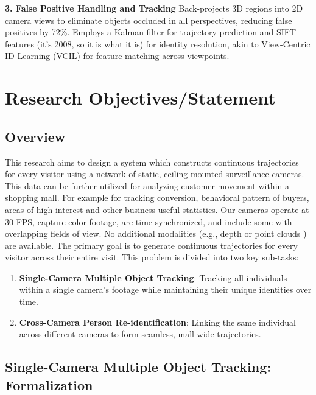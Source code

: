 \documentclass[12pt, a4paper]{article}
\begin{document}
 \textbf{3. False Positive Handling and Tracking} Back-projects 3D regions into 2D camera views to eliminate objects occluded in all perspectives, reducing false positives by 72\%. Employs a Kalman filter for trajectory prediction and SIFT features (it's 2008, so it is what it is) for identity resolution, akin to \cite{Homography-UAV} View-Centric ID Learning (VCIL) for feature matching across viewpoints.

\section{Research Objectives/Statement}

\subsection{Overview}

This research aims to design a system which constructs continuous trajectories for every visitor using a network of static, ceiling-mounted surveillance cameras. This data can be further utilized for analyzing customer movement within a shopping mall. For example for tracking conversion, behavioral pattern of buyers, areas of high interest and other business-useful statistics. Our cameras operate at 30 FPS, capture color footage, are time-synchronized, and include some with overlapping fields of view. No additional modalities (e.g., depth or point clouds \cite{rgb-depth, 3D-pose-estimation-review, PointNet}) are available. The primary goal is to generate continuous trajectories for every visitor across their entire visit. This problem is divided into two key sub-tasks:

\begin{enumerate}
	\item \textbf{Single-Camera Multiple Object Tracking}: Tracking all individuals within a single camera’s footage while maintaining their unique identities over time.
	\item \textbf{Cross-Camera Person Re-identification}: Linking the same individual across different cameras to form seamless, mall-wide trajectories. 
\end{enumerate}

\subsection{Single-Camera Multiple Object Tracking: Formalization}
\label{subsec:sigle-camera-formalization}
\end{document}
